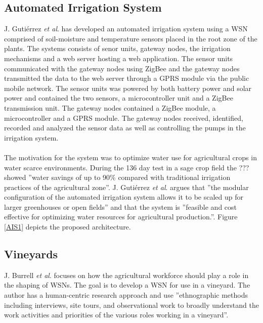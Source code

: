 \documentclass[]{uiophd}
\begin{document}
\subsection{Automated Irrigation System}
J. Gutiérrez \textit{et al}. \parencite{6582678} has developed an automated irrigation system using a WSN comprised of soil-moisture and temperature sensors placed in the root zone of the plants. The systems consists of senor units, gateway nodes, the irrigation mechanisms and a web server hosting a web application. The sensor units communicated with the gateway nodes using ZigBee and the gateway nodes transmitted the data to the web server through a GPRS module via the public mobile network. The sensor units was powered by both battery power and solar power and contained the two sensors, a microcontroller unit and a ZigBee transmission unit. The gateway nodes contained a ZigBee module, a microcontroller and a GPRS module. The gateway nodes received, identified, recorded and analyzed the sensor data as well as controlling the pumps in the irrigation system.
\\\\
The motivation for the system was to optimize water use for agricultural crops in water scarce environments. During the 136 day test in a sage crop field the ??? showed ''water savings of up to 90\% compared with traditional irrigation practices of the agricultural zone''\parencite{6582678174}. J. Gutiérrez \textit{et al}. argues that ''the modular configuration of the automated irrigation system allows it to be scaled up for larger greenhouses or open fields''\parencite{6582678166} and that the system is ''feasible and cost effective for optimizing water resources for agricultural production.''\parencite{6582678174}. Figure \ref{AIS1} depicts the proposed architecture.

\subsection{Vineyards}
J. Burrell \textit{et al}.\parencite{1269130} focuses on how the agricultural workforce should play a role in the shaping of WSNs. The goal is to develop a WSN for use in a vineyard. The author has a human-centric research approach and use ''ethnographic methods including interviews, site tours, and observational work to broadly understand the work activities and priorities of the various roles working in a vineyard''\parencite{126913038}.
\end{document}
